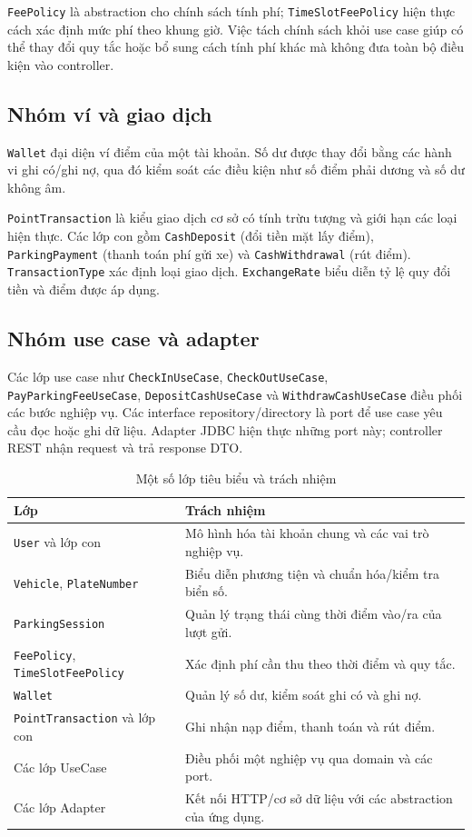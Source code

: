 \texttt{FeePolicy} là abstraction cho chính sách tính phí; \texttt{TimeSlotFeePolicy} hiện thực cách xác định mức phí theo khung giờ. Việc tách chính sách khỏi use case giúp có thể thay đổi quy tắc hoặc bổ sung cách tính phí khác mà không đưa toàn bộ điều kiện vào controller.

\subsection{Nhóm ví và giao dịch}
\texttt{Wallet} đại diện ví điểm của một tài khoản. Số dư được thay đổi bằng các hành vi ghi có/ghi nợ, qua đó kiểm soát các điều kiện như số điểm phải dương và số dư không âm.

\texttt{PointTransaction} là kiểu giao dịch cơ sở có tính trừu tượng và giới hạn các loại hiện thực. Các lớp con gồm \texttt{CashDeposit} (đổi tiền mặt lấy điểm), \texttt{ParkingPayment} (thanh toán phí gửi xe) và \texttt{CashWithdrawal} (rút điểm). \texttt{TransactionType} xác định loại giao dịch. \texttt{ExchangeRate} biểu diễn tỷ lệ quy đổi tiền và điểm được áp dụng.

\subsection{Nhóm use case và adapter}
Các lớp use case như \texttt{CheckInUseCase}, \texttt{CheckOutUseCase}, \texttt{PayParkingFeeUseCase}, \texttt{DepositCashUseCase} và \texttt{WithdrawCashUseCase} điều phối các bước nghiệp vụ. Các interface repository/directory là port để use case yêu cầu đọc hoặc ghi dữ liệu. Adapter JDBC hiện thực những port này; controller REST nhận request và trả response DTO.

\begin{table}[htbp]
\centering
\caption{Một số lớp tiêu biểu và trách nhiệm}
\label{tab:domain-classes}
\begin{tabular}{|p{3.5cm}|p{9.5cm}|}
\hline
\textbf{Lớp} & \textbf{Trách nhiệm} \\ \hline
\texttt{User} và lớp con & Mô hình hóa tài khoản chung và các vai trò nghiệp vụ. \\ \hline
\texttt{Vehicle}, \texttt{PlateNumber} & Biểu diễn phương tiện và chuẩn hóa/kiểm tra biển số. \\ \hline
\texttt{ParkingSession} & Quản lý trạng thái cùng thời điểm vào/ra của lượt gửi. \\ \hline
\texttt{FeePolicy}, \texttt{TimeSlotFeePolicy} & Xác định phí cần thu theo thời điểm và quy tắc. \\ \hline
\texttt{Wallet} & Quản lý số dư, kiểm soát ghi có và ghi nợ. \\ \hline
\texttt{PointTransaction} và lớp con & Ghi nhận nạp điểm, thanh toán và rút điểm. \\ \hline
Các lớp UseCase & Điều phối một nghiệp vụ qua domain và các port. \\ \hline
Các lớp Adapter & Kết nối HTTP/cơ sở dữ liệu với các abstraction của ứng dụng. \\ \hline
\end{tabular}
\end{table}

